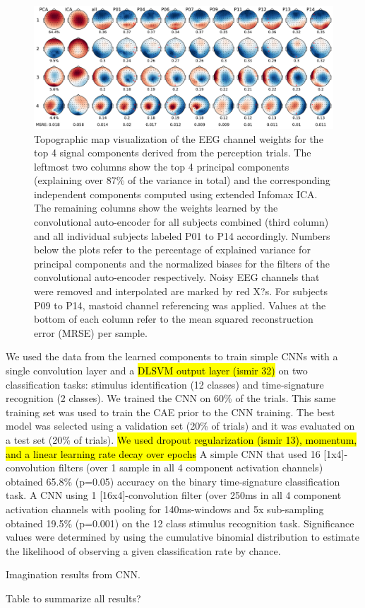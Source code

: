 \begin{figure}[t]
  \begin{center}
    \includegraphics[width=\columnwidth,keepaspectratio=true]{Figures/topoplots_all.pdf}
    \caption{
Topographic map visualization of the EEG channel weights for the top 4 signal components derived from the perception trials. The leftmost two columns show the top 4 principal components (explaining over 87\% of the variance in total) and the corresponding independent components computed using extended Infomax ICA. The remaining columns show the weights learned by the convolutional auto-encoder for all subjects combined (third column) and all individual subjects labeled P01 to P14 accordingly. Numbers below the plots refer to the percentage of explained variance for principal components and the normalized biases for the filters of the convolutional auto-encoder respectively. Noisy EEG channels that were removed and interpolated are marked by red X?s. For subjects P09 to P14, mastoid channel referencing was applied. Values at the bottom of each column refer to the mean squared reconstruction error (MRSE) per sample.
}
    \label{fig:components}
  \end{center}
\end{figure}

We used the data from the learned components to train simple \ac{CNN}s with a single convolution layer and a \hl{DLSVM output layer (ismir 32)} on two classification tasks: stimulus identification (12 classes) and time-signature recognition (2 classes). 
We trained the CNN on 60\% of the trials. This same training set was used to train the \ac{CAE} prior to the \ac{CNN} training. 
The best model was selected using a validation set (20\% of trials) and it was evaluated on a test set (20\% of trials). 
\hl{We used dropout regularization (ismir 13), momentum,  and a linear learning rate decay over epochs}
A simple \ac{CNN} that used 16 [1x4]-convolution filters (over 1 sample in all 4 component activation channels) obtained 65.8\% (p=0.05) accuracy on the binary time-signature classification task. 
A CNN using 1 [16x4]-convolution filter (over 250ms in all 4 component activation channels with pooling for 140ms-windows and 5x sub-sampling obtained 19.5\% (p=0.001) on the 12 class stimulus recognition task. 
Significance values were determined by using the cumulative binomial distribution to estimate the likelihood of observing a given classification rate by chance.

Imagination results from CNN. 

Table to summarize all results? 
